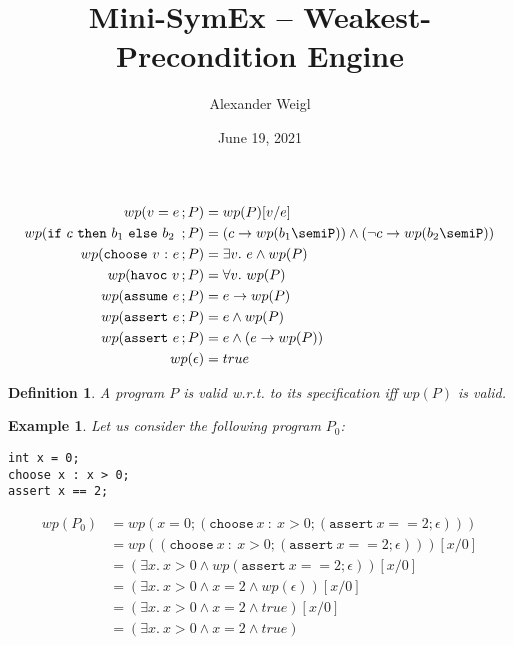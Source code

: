 \documentclass[a4paper]{article}
\newtheorem{definition}{Definition}
\newtheorem{example}{Example}
\DeclareMathOperator{\semi}{;}
\begin{document}
\author{Alexander Weigl}
\title{Mini-SymEx -- Weakest-Precondition Engine}
\date{June 19, 2021}
\maketitle



\begin{align*}
  wp( v = e \semi P)
  & = wp(P)[v/e]
  \\
  wp( \mathtt{if}~c~\mathtt{then}~b_1~\mathtt{else}~b_2~\semi P)
  & = (c \rightarrow wp(b_1\semiP))
    \land (\neg c \rightarrow wp(b_2\semiP))
  \\
  wp( \mathtt{choose}~v~\mathtt{:}~e\semi P)
  & = \exists v.~ e \land wp(P)
  \\
  wp( \mathtt{havoc}~v\semi P)
  & = \forall v.~ wp(P)
  \\
  wp( \mathtt{assume}~e\semi P)
  & = e \rightarrow wp(P)
  \\
  wp( \mathtt{assert}~e\semi P)
  & = e \land wp(P)
  \\
  wp( \mathtt{assert}~e\semi P)
  & = e \land (e \rightarrow wp(P))
  \\
  wp(\epsilon) & = true
\end{align*}

\begin{definition}
  A program $P$ is valid w.r.t. to its specification iff $wp(P)$ is
  valid.
\end{definition}

\begin{example}
Let us consider the following program $P_0$:
\begin{verbatim}
int x = 0;
choose x : x > 0;
assert x == 2;
\end{verbatim}

\begin{align*}
  wp(P_0) & = wp(x = 0 \semi(\mathtt{choose}~x~\mathtt:~x >
            0\semi(\mathtt{assert}~x==2\semi\epsilon)))
  \\
  &= wp((\mathtt{choose}~x~\mathtt:~x >
    0\semi(\mathtt{assert}~x==2\semi\epsilon)))[x/0]
  \\
  &= (\exists x.~ x>0 \land wp(\mathtt{assert}~x==2\semi\epsilon))[x/0]
  \\
  &= (\exists x.~ x>0 \land x=2 \wedge wp(\epsilon) )[x/0]
  \\
  &= (\exists x.~ x>0 \land x=2 \wedge true)[x/0]
  \\
  &= (\exists x.~ x>0 \land x=2 \wedge true)
\end{align*}
\end{example}
\end{document}
